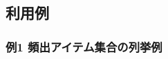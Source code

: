 \documentclass[a4paper]{jarticle}
\begin{document}


\subsection*{利用例}
\subsubsection*{例1 頻出アイテム集合の列挙例}
\end{document}
